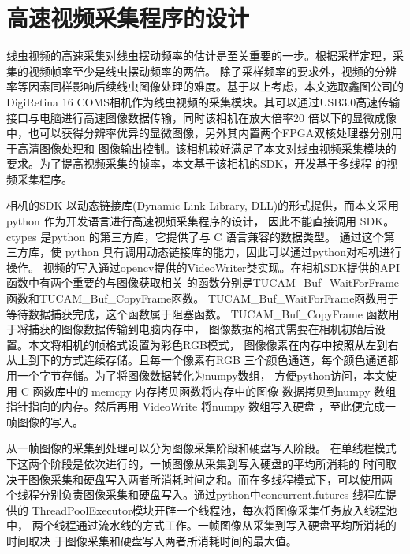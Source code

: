 \section{高速视频采集程序的设计}
	线虫视频的高速采集对线虫摆动频率的估计是至关重要的一步。根据采样定理，采集的视频帧率至少是线虫摆动频率的两倍。
	除了采样频率的要求外，视频的分辨率等因素同样影响后续线虫图像处理的难度。基于以上考虑，本文选取鑫图公司的DigiRetina 16
	 COMS相机作为线虫视频的采集模块。其可以通过USB3.0高速传输接口与电脑进行高速图像数据传输，同时该相机在放大倍率20
	 倍以下的显微成像中，也可以获得分辨率优异的显微图像，另外其内置两个FPGA双核处理器分别用于高清图像处理和
	 图像输出控制。该相机较好满足了本文对线虫视频采集模块的要求。为了提高视频采集的帧率，本文基于该相机的SDK，开发基于多线程
	 的视频采集程序。
	 
	相机的SDK 以动态链接库(Dynamic Link Library, DLL)的形式提供，而本文采用 python 作为开发语言进行高速视频采集程序的设计，
	因此不能直接调用 SDK。ctypes 是python 的第三方库，它提供了与 C 语言兼容的数据类型。
	通过这个第三方库，使 python 具有调用动态链接库的能力，因此可以通过python对相机进行操作。
	视频的写入通过opencv提供的VideoWriter类实现。在相机SDK提供的API函数中有两个重要的与图像获取相关
	的函数分别是TUCAM\_Buf\_WaitForFrame 函数和TUCAM\_Buf\_CopyFrame函数。
	TUCAM\_Buf\_WaitForFrame函数用于等待数据捕获完成，这个函数属于阻塞函数。
	TUCAM\_Buf\_CopyFrame 函数用于将捕获的图像数据传输到电脑内存中，
	图像数据的格式需要在相机初始后设置。本文将相机的帧格式设置为彩色RGB模式，
	图像像素在内存中按照从左到右从上到下的方式连续存储。且每一个像素有RGB
	三个颜色通道，每个颜色通道都用一个字节存储。为了将图像数据转化为numpy数组，
	方便python访问，本文使用 C 函数库中的 memcpy 内存拷贝函数将内存中的图像
	数据拷贝到numpy 数组指针指向的内存。然后再用 VideoWrite 将numpy 数组写入硬盘
	，至此便完成一帧图像的写入。
	
	从一帧图像的采集到处理可以分为图像采集阶段和硬盘写入阶段。
	在单线程模式下这两个阶段是依次进行的，一帧图像从采集到写入硬盘的平均所消耗的
	时间取决于图像采集和硬盘写入两者所消耗时间之和。而在多线程模式下，可以使用两
	个线程分别负责图像采集和硬盘写入。通过python中concurrent.futures 线程库提供的
	ThreadPoolExecutor模块开辟一个线程池，每次将图像采集任务放入线程池中，
	两个线程通过流水线的方式工作。一帧图像从采集到写入硬盘平均所消耗的时间取决
	于图像采集和硬盘写入两者所消耗时间的最大值。
	
